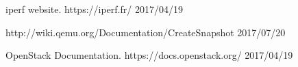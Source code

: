 \documentclass[submit,techrep]{ipsj}
\begin{document}
\begin{thebibliography}{10}
  iperf website.  https://iperf.fr/ 2017/04/19

	http://wiki.qemu.org/Documentation/CreateSnapshot 2017/07/20

  OpenStack Documentation. https://docs.openstack.org/ 2017/04/19











\end{thebibliography}



\end{document}
